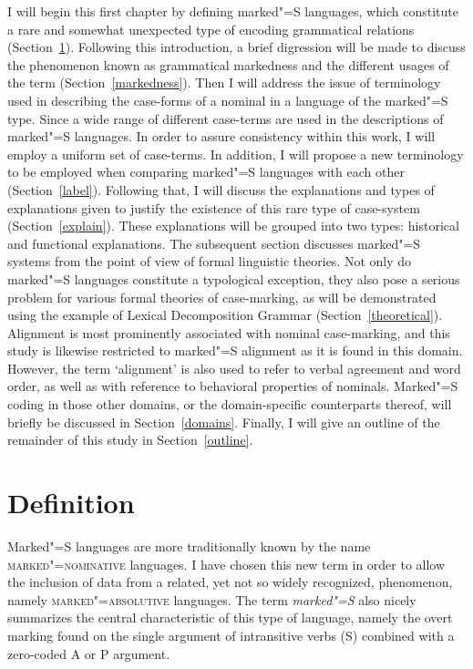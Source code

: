 I will begin this first chapter by defining marked"=S languages, which constitute a rare and somewhat unexpected type of encoding grammatical relations (Section~\ref{definition}). 
Following this introduction, a brief digression will be made to discuss the phenomenon known as grammatical markedness and the different usages of the term (Section~\ref{markedness}). 
Then I will address the issue of terminology used in describing the case-forms of a nominal in a language of the marked"=S type. 
Since a wide range of different case-terms are used in the descriptions of marked"=S languages. 
In order to assure consistency within this work, I will employ a uniform set of case-terms. 
In addition, I will propose a new terminology to be employed when comparing marked"=S languages with each other (Section~\ref{label}). 
Following that, I will discuss the explanations and types of explanations given to justify the existence of this rare type of case-system (Section~\ref{explain}). 
These explanations will be grouped into two types: historical and functional explanations.
The subsequent section discusses marked"=S systems from the point of view of formal linguistic theories. 
Not only do marked"=S languages constitute a typological exception, they also pose a serious problem for various formal theories of case-marking, as will be demonstrated using the example of Lexical Decomposition Grammar (Section~\ref{theoretical}).
Alignment is most prominently associated with nominal case-marking, and this study is likewise restricted to marked"=S alignment as it is found in this domain. 
However, the term `alignment' is also used to refer to verbal agreement and word order, as well as with reference to behavioral properties of nominals. 
Marked"=S coding in those other domains, or the domain-specific counterparts thereof, will briefly
be discussed in Section~\ref{domains}.\enlargethispage{\baselineskip}
Finally, I will give an outline of the remainder of this study in Section~\ref{outline}.


\section{Definition}\label{definition}

Marked"=S languages are more traditionally known by the name \textsc{marked"=nominative} languages. 
I have chosen this new term in order to allow the inclusion of data from a related, yet not so widely recognized, phenomenon, namely \textsc{marked"=absolutive} languages. 
The term \textit{marked"=S} also nicely summarizes the central characteristic of this type of language, namely the overt marking found on the single argument of intransitive verbs (S) combined with a zero-coded A or P argument. 

